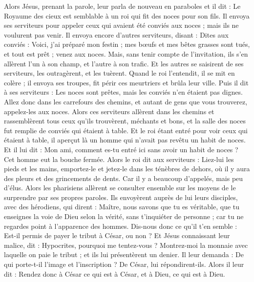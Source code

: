 \begin{multicols}{2}
\VerseOne{}Alors Jésus, prenant la parole, leur parla de nouveau en paraboles et il dit :
Le Royaume des cieux est semblable à un roi qui fit des noces pour son fils.
Il envoya ses serviteurs pour appeler ceux qui avaient été conviés aux noces ; mais ils ne voulurent pas venir.
Il envoya encore d'autres serviteurs, disant : Dites aux conviés : Voici, j'ai préparé mon festin ; mes bœufs et mes bêtes grasses sont tués, et tout est prêt ; venez aux noces.
Mais, sans tenir compte de l'invitation, ils s'en allèrent l'un à son champ, et l'autre à son trafic.
Et les autres se saisirent de ses serviteurs, les outragèrent, et les tuèrent.
Quand le roi l'entendit, il se mit en colère ; il envoya ses troupes, fit périr ces meurtriers et brûla leur ville.
Puis il dit à ses serviteurs : Les noces sont prêtes, mais les conviés n'en étaient pas dignes.
Allez donc dans les carrefours des chemins, et autant de gens que vous trouverez, appelez-les aux noces.
Alors ces serviteurs allèrent dans les chemins et rassemblèrent tous ceux qu'ils trouvèrent, méchants et bons, et la salle des noces fut remplie de conviés qui étaient à table.
Et le roi étant entré pour voir ceux qui étaient à table, il aperçut là un homme qui n'avait pas revêtu un habit de noces.
Et il lui dit : Mon ami, comment es-tu entré ici sans avoir un habit de noces ? Cet homme eut la bouche fermée.
Alors le roi dit aux serviteurs : Liez-lui les pieds et les mains, emportez-le et jetez-le dans les ténèbres de dehors, où il y aura des pleurs et des grincements de dents.
Car il y a beaucoup d'appelés, mais peu d'élus.
Alors les pharisiens allèrent se consulter ensemble sur les moyens de le surprendre par ses propres paroles.
Ils envoyèrent auprès de lui leurs disciples, avec des hérodiens, qui dirent : Maître, nous savons que tu es véritable, que tu enseignes la voie de Dieu selon la vérité, sans t'inquiéter de personne ; car tu ne regardes point à l'apparence des hommes.
Dis-nous donc ce qu'il t'en semble : Est-il permis de payer le tribut à César, ou non ?
Et Jésus connaissant leur malice, dit : Hypocrites, pourquoi me tentez-vous ?
Montrez-moi la monnaie avec laquelle on paie le tribut ; et ils lui présentèrent un denier.
Il leur demanda : De qui porte-t-il l'image et l'inscription ?
De César, lui répondirent-ils. Alors il leur dit : Rendez donc à César ce qui est à César, et à Dieu, ce qui est à Dieu.

\end{multicols}
